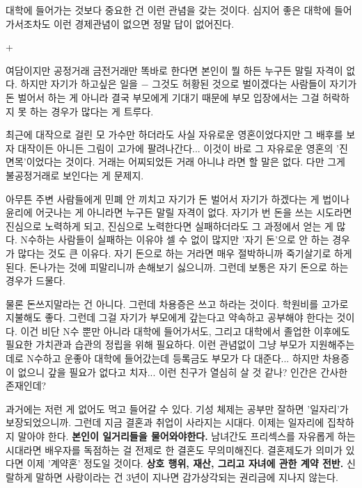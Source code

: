 대학에 들어가는 것보다 중요한 건 이런 관념을 갖는 것이다.
심지어 좋은 대학에 들어가서조차도 이런 경제관념이 없으면 정말 답이 없어진다.
\vspace{5mm}

+
\vspace{5mm}

여담이지만 공정거래 금전거래만 똑바로 한다면 본인이 뭘 하든 누구든 말릴 자격이 없다.
하지만 자기가 하고싶은 일을 $-$ 그것도 허황된 것으로 벌이겠다는 사람들이 자기가 돈 벌어서 하는 게 아니라
결국 부모에게 기대기 때문에 부모 입장에서는 그걸 허락하지 못 하는 경우가 많다는 게 트루다.
\vspace{5mm}

최근에 대작으로 걸린 모 가수만 하더라도 사실 자유로운 영혼이었다지만 그 배후를 보자
대작이든 아니든 그림이 고가에 팔려나간다... 이것이 바로 그 자유로운 영혼의 '진면목'이었다는 것이다.
거래는 어찌되었든 거래 아니냐 라면 할 말은 없다. 다만 그게 불공정거래로 보인다는 게 문제지.
\vspace{5mm}

아무튼 주변 사람들에게 민폐 안 끼치고 자기가 돈 벌어서 자기가 하겠다는 게 법이나 윤리에 어긋나는 게 아니라면 누구든 말릴 자격이 없다.
자기가 번 돈을 쓰는 시도라면 진심으로 노력하게 되고, 진심으로 노력한다면 실패하더라도 그 과정에서 얻는 게 많다.
N수하는 사람들이 실패하는 이유야 셀 수 없이 많지만 '자기 돈'으로 안 하는 경우가 많다는 것도 큰 이유다.
자기 돈으로 하는 거라면 매우 절박하니까 죽기살기로 하게 된다. 돈나가는 것에 피말리니까 손해보기 싫으니까.
그런데 보통은 자기 돈으로 하는 경우가 드물다.
\vspace{5mm}

물론 돈쓰지말라는 건 아니다. 그런데 차용증은 쓰고 하라는 것이다.
학원비를 고가로 지불해도 좋다. 그런데 그걸 자기가 부모에게 갚는다고 약속하고 공부해야 한다는 것이다.
이건 비단 N수 뿐만 아니라 대학에 들어가서도, 그리고 대학에서 졸업한 이후에도 필요한 가치관과 습관의 정립을 위해 필요하다.
이런 관념없이 그냥 부모가 지원해주는 데로 N수하고 운좋아 대학에 들어갔는데 등록금도 부모가 다 대준다...
하지만 차용증이 없으니 갚을 필요가 없다고 치자... 이런 친구가 열심히 살 것 같나? 인간은 간사한 존재인데?
\vspace{5mm}

과거에는 저런 게 없어도 먹고 들어갈 수 있다. 기성 체제는 공부만 잘하면 '일자리'가 보장되었으니까.
그런데 지금 결혼과 취업이 사라지는 시대다. 이제는 일자리에 집착하지 말아야 한다. \textbf{본인이 일거리들을 물어와야한다.}
남녀간도 프리섹스를 자유롭게 하는 시대라면 배우자를 독점하는 걸 전제로 한 결혼도 무의미해진다.
결혼제도가 의미가 있다면 이제 '계약혼' 정도일 것이다. \textbf{상호 행위, 재산, 그리고 자녀에 관한 계약 전반.}
신랄하게 말하면 사랑이라는 건 3년이 지나면 감가상각되는 권리금에 지나지 않는다.
\vspace{5mm}

